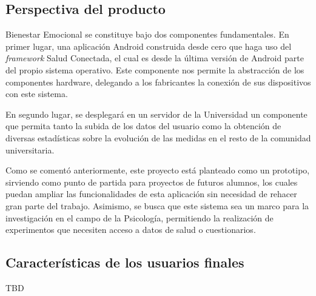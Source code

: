     \subsection{Perspectiva del producto}
        Bienestar Emocional se constituye bajo dos componentes fundamentales. En primer lugar, una aplicación Android construida desde cero que haga uso del \textit{framework} Salud Conectada, el cual es desde la última versión de Android parte del propio sistema operativo. Este componente nos permite la abstracción de los componentes hardware, delegando a los fabricantes la conexión de sus dispositivos con este sistema.

        En segundo lugar, se desplegará en un servidor de la Universidad un componente que permita tanto la subida de los datos del usuario como la obtención de diversas estadísticas sobre la evolución de las medidas en el resto de la comunidad universitaria.

        Como se comentó anteriormente, este proyecto está planteado como un prototipo, sirviendo como punto de partida para proyectos de futuros alumnos, los cuales puedan ampliar las funcionalidades de esta aplicación sin necesidad de rehacer gran parte del trabajo. Asimismo, se busca que este sistema sea un marco para la investigación en el campo de la Psicología, permitiendo la realización de experimentos que necesiten acceso a datos de salud o cuestionarios.


    \subsection{Características de los usuarios finales}

    TBD

    
        

